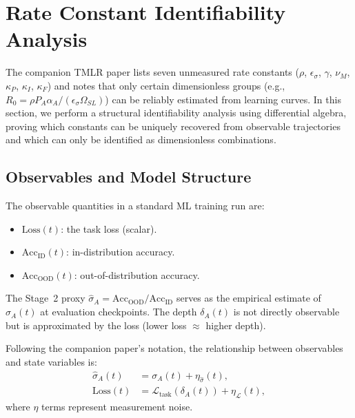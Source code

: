 
\section{Rate Constant Identifiability Analysis}
\label{sec:identifiability}

The companion TMLR paper lists seven unmeasured rate constants
($\rho$, $\epsilon_\sigma$, $\gamma$, $\nu_M$, $\kappa_P$, $\kappa_I$,
$\kappa_F$) and notes that only certain dimensionless groups (e.g.,
$R_0 = \rho P_A \alpha_A / (\epsilon_\sigma \Omega_{SL})$) can be
reliably estimated from learning curves. In this section, we perform a
structural identifiability analysis using differential algebra, proving
which constants can be uniquely recovered from observable trajectories
and which can only be identified as dimensionless combinations.

\subsection{Observables and Model Structure}

The observable quantities in a standard ML training run are:
\begin{itemize}
\item $\mathrm{Loss}(t)$: the task loss (scalar).
\item $\mathrm{Acc}_{\mathrm{ID}}(t)$: in-distribution accuracy.
\item $\mathrm{Acc}_{\mathrm{OOD}}(t)$: out-of-distribution accuracy.
\end{itemize}

The Stage~2 proxy $\hat{\sigma}_A = \mathrm{Acc}_{\mathrm{OOD}} / \mathrm{Acc}_{\mathrm{ID}}$
serves as the empirical estimate of $\sigma_A(t)$ at evaluation checkpoints.
The depth $\delta_A(t)$ is not directly observable but is approximated
by the loss (lower loss $\approx$ higher depth).

Following the companion paper's notation, the relationship between
observables and state variables is:
\begin{align}
\hat{\sigma}_A(t) &= \sigma_A(t) + \eta_{\hat{\sigma}}(t), \\
\mathrm{Loss}(t) &= \mathcal{L}_{\mathrm{task}}(\delta_A(t)) + \eta_{\mathcal{L}}(t),
\end{align}
where $\eta$ terms represent measurement noise.

